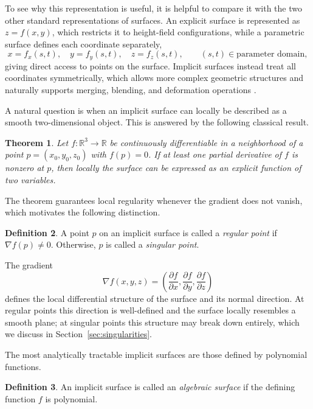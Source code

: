 \documentclass[12pt, a4paper, oneside]{book}
\theoremstyle{plain}
\newtheorem{theorem}{Theorem}[chapter]
\theoremstyle{definition}
\newtheorem{definition}[theorem]{Definition}
\theoremstyle{remark}
\theoremstyle{definition}
\begin{document}
To see why this representation is useful, it is helpful to compare it with the two other
standard representations of surfaces. An explicit surface is represented as
$z=f(x,y)$, which restricts it to height-field configurations, while a parametric surface
defines each coordinate separately,
\[
x=f_x(s,t), \quad y=f_y(s,t), \quad z=f_z(s,t), \qquad (s,t)\in \text{parameter domain},
\]
giving direct access to points on the surface. Implicit surfaces instead treat all
coordinates symmetrically, which allows more complex geometric structures and naturally
supports merging, blending, and deformation operations \cite{bloomenthal2000implicit}.

A natural question is when an implicit surface can locally be described as a smooth
two-dimensional object. This is answered by the following classical result.

\begin{theorem}
Let $f : \mathbb{R}^3 \to \mathbb{R}$ be continuously differentiable in a neighborhood of
a point $p=(x_0,y_0,z_0)$ with $f(p)=0$. If at least one partial derivative of $f$ is
nonzero at $p$, then locally the surface can be expressed as an explicit function of two
variables.
\end{theorem}

The theorem guarantees local regularity whenever the gradient does not vanish, which
motivates the following distinction.

\begin{definition}
\label{def:regular-singular}
A point $p$ on an implicit surface is called a \emph{regular point} if
$\nabla f(p)\neq 0$. Otherwise, $p$ is called a \emph{singular point}.
\end{definition}

The gradient
\[
\nabla f(x,y,z)=
\left(
\frac{\partial f}{\partial x},
\frac{\partial f}{\partial y},
\frac{\partial f}{\partial z}
\right)
\]
defines the local differential structure of the surface and its normal direction. At
regular points this direction is well-defined and the surface locally resembles a smooth
plane; at singular points this structure may break down entirely, which we discuss in
Section~\ref{sec:singularities}.

The most analytically tractable implicit surfaces are those defined by polynomial
functions.

\begin{definition}
An implicit surface is called an \emph{algebraic surface} if the defining function $f$
is polynomial.
\end{definition}
\end{document}
